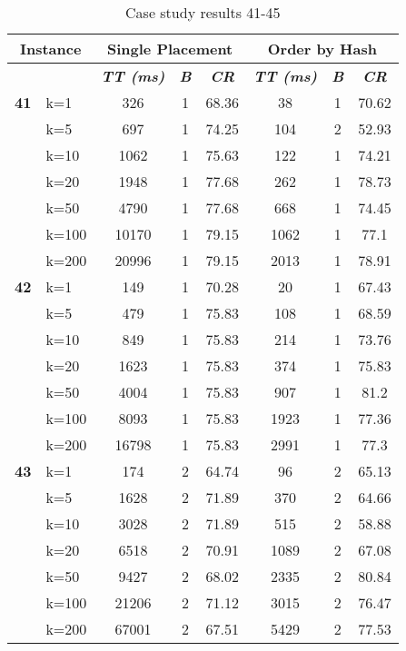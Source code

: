     \begin{table}[htbp]
    \caption{Case study results 41-45}
    \centering
    \begin{tabular}{|l|l|c|c|c|c|c|c|}
    \hline
    \multicolumn{ 2}{|c|}{\textbf{Instance}} & \multicolumn{ 3}{c|}{\textbf{Single Placement}} & \multicolumn{ 3}{c|}{\textbf{Order by Hash}} \\ \hline
    \multicolumn{ 2}{|l|}{} & \textbf{\textit{TT (ms)}} & \textbf{\textit{B}} & \textbf{\textit{CR}} & \textbf{\textit{TT (ms)}} & \textbf{\textit{B}} & \textbf{\textit{CR}} \\ \hline
    \multicolumn{1}{|r|}{\textbf{41}} & k=1 & 326 & 1 & 68.36 & 38 & 1 & 70.62 \\ 
     & k=5 & 697 & 1 & 74.25 & 104 & 2 & 52.93 \\ 
     & k=10 & 1062 & 1 & 75.63 & 122 & 1 & 74.21 \\ 
     & k=20 & 1948 & 1 & 77.68 & 262 & 1 & 78.73 \\ 
     & k=50 & 4790 & 1 & 77.68 & 668 & 1 & 74.45 \\ 
     & k=100 & 10170 & 1 & 79.15 & 1062 & 1 & 77.1 \\ 
     & k=200 & 20996 & 1 & 79.15 & 2013 & 1 & 78.91 \\ \hline
    \multicolumn{1}{|r|}{\textbf{42}} & k=1 & 149 & 1 & 70.28 & 20 & 1 & 67.43 \\ 
     & k=5 & 479 & 1 & 75.83 & 108 & 1 & 68.59 \\ 
     & k=10 & 849 & 1 & 75.83 & 214 & 1 & 73.76 \\ 
     & k=20 & 1623 & 1 & 75.83 & 374 & 1 & 75.83 \\ 
     & k=50 & 4004 & 1 & 75.83 & 907 & 1 & 81.2 \\ 
     & k=100 & 8093 & 1 & 75.83 & 1923 & 1 & 77.36 \\ 
     & k=200 & 16798 & 1 & 75.83 & 2991 & 1 & 77.3 \\ \hline
    \multicolumn{1}{|r|}{\textbf{43}} & k=1 & 174 & 2 & 64.74 & 96 & 2 & 65.13 \\ 
     & k=5 & 1628 & 2 & 71.89 & 370 & 2 & 64.66 \\ 
     & k=10 & 3028 & 2 & 71.89 & 515 & 2 & 58.88 \\ 
     & k=20 & 6518 & 2 & 70.91 & 1089 & 2 & 67.08 \\ 
     & k=50 & 9427 & 2 & 68.02 & 2335 & 2 & 80.84 \\ 
     & k=100 & 21206 & 2 & 71.12 & 3015 & 2 & 76.47 \\ 
     & k=200 & 67001 & 2 & 67.51 & 5429 & 2 & 77.53 \\ \hline

\end{tabular}
\end{table}
